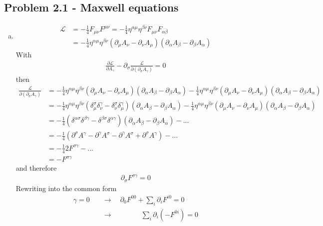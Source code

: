 \documentclass[../main.tex]{subfiles}
\begin{document}
\subsection{Problem 2.1 - Maxwell equations}
\begin{enumerate}[(a)]
\item
\begin{align}
\mathcal{L}&=-\frac{1}{4}F_{\mu\nu}F^{\mu\nu}=-\frac{1}{4}\eta^{\alpha\mu}\eta^{\beta\nu}F_{\mu\nu}F_{\alpha\beta}\\
&=-\frac{1}{4}\eta^{\alpha\mu}\eta^{\beta\nu}(\partial_\mu A_\nu-\partial_\nu A_\mu)(\partial_\alpha A_\beta-\partial_\beta A_\alpha)
\end{align}
With
\begin{align}
\frac{\partial\mathcal{L}}{\partial A_\gamma}-\partial_\sigma\frac{\mathcal{L}}{\partial(\partial_\sigma A_\gamma)}=0
\end{align}
then
\begin{align}
\frac{\mathcal{L}}{\partial(\partial_\sigma A_\gamma)}
&=-\frac{1}{4}\eta^{\alpha\mu}\eta^{\beta\nu}(\partial_\mu A_\nu-\partial_\nu A_\mu)(\partial_\alpha A_\beta-\partial_\beta A_\alpha)
-\frac{1}{4}\eta^{\alpha\mu}\eta^{\beta\nu}(\partial_\mu A_\nu-\partial_\nu A_\mu)(\partial_\alpha A_\beta-\partial_\beta A_\alpha)\\
&=-\frac{1}{4}\eta^{\alpha\mu}\eta^{\beta\nu}(\delta_\mu^\sigma\delta_\nu^\gamma-\delta_\nu^\sigma\delta_\mu^\gamma)(\partial_\alpha A_\beta-\partial_\beta A_\alpha)
-\frac{1}{4}\eta^{\alpha\mu}\eta^{\beta\nu}(\partial_\mu A_\nu-\partial_\nu A_\mu)(\partial_\alpha A_\beta-\partial_\beta A_\alpha)\\
&=-\frac{1}{4}(\delta^{\alpha\sigma}\delta^{\beta\gamma}-\delta^{\beta\sigma}\delta^{\alpha\gamma})(\partial_\alpha A_\beta-\partial_\beta A_\alpha)-...\\
&=-\frac{1}{4}(\partial^\sigma A^\gamma-\partial^\gamma A^\sigma-\partial^\gamma A^\sigma+\partial^\sigma A^\gamma)-...\\
&=-\frac{1}{4}2F^{\sigma\gamma}-...\\
&=-F^{\sigma\gamma}
\end{align}
and therefore
\begin{align}
\partial_\sigma F^{\sigma\gamma}=0
\end{align}
Rewriting into the common form
\begin{align}
\gamma=0
&\quad\rightarrow\quad\partial_0F^{00}+\sum_i\partial_iF^{i0}=0\\
&\quad\rightarrow\qquad\qquad\sum_i\partial_i(-F^{0i})=0\\

\end{align}
\end{enumerate}
\end{document}
